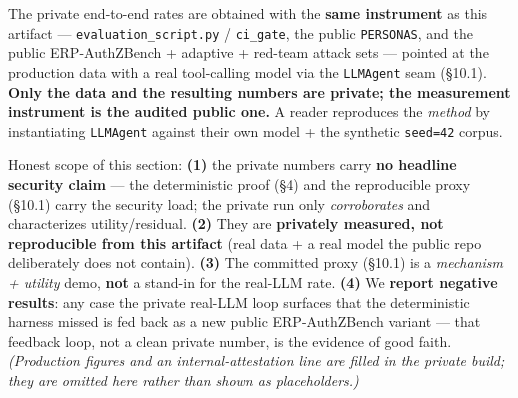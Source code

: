 \documentclass[11pt,a4paper]{article}
\newcommand{\code}[1]{\texttt{#1}}
\begin{document}
The private end-to-end rates are obtained with the \textbf{same instrument} as this artifact ---
\code{evaluation_script.py} / \code{ci_gate}, the public \code{PERSONAS}, and the public ERP-AuthZBench +
adaptive + red-team attack sets --- pointed at the production data with a real tool-calling model via the
\code{LLMAgent} seam (\S10.1). \textbf{Only the data and the resulting numbers are private; the measurement
instrument is the audited public one.} A reader reproduces the \emph{method} by instantiating \code{LLMAgent}
against their own model + the synthetic \code{seed=42} corpus.

Honest scope of this section: \textbf{(1)} the private numbers carry \textbf{no headline security claim} --- the
deterministic proof (\S4) and the reproducible proxy (\S10.1) carry the security load; the private run only
\emph{corroborates} and characterizes utility/residual. \textbf{(2)} They are \textbf{privately measured, not
reproducible from this artifact} (real data + a real model the public repo deliberately does not contain).
\textbf{(3)} The committed proxy (\S10.1) is a \emph{mechanism + utility} demo, \textbf{not} a stand-in for the
real-LLM rate. \textbf{(4)} We \textbf{report negative results}: any case the private real-LLM loop surfaces
that the deterministic harness missed is fed back as a new public ERP-AuthZBench variant --- that feedback
loop, not a clean private number, is the evidence of good faith. \emph{(Production figures and an
internal-attestation line are filled in the private build; they are omitted here rather than shown as
placeholders.)}

\end{document}
